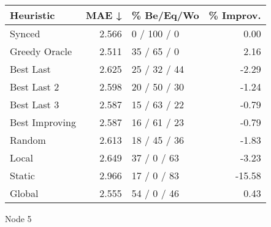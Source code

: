 \begin{tabular}{lrlr}
\toprule
\textbf{Heuristic} & \textbf{MAE ↓} & \textbf{\% Be/Eq/Wo} & \textbf{\% Improv.} \\
\midrule
            Synced &          2.566 &          0 / 100 / 0 &                0.00 \\
     Greedy Oracle &          2.511 &          35 / 65 / 0 &                2.16 \\
         Best Last &          2.625 &         25 / 32 / 44 &               -2.29 \\
       Best Last 2 &          2.598 &         20 / 50 / 30 &               -1.24 \\
       Best Last 3 &          2.587 &         15 / 63 / 22 &               -0.79 \\
    Best Improving &          2.587 &         16 / 61 / 23 &               -0.79 \\
            Random &          2.613 &         18 / 45 / 36 &               -1.83 \\
             Local &          2.649 &          37 / 0 / 63 &               -3.23 \\
            Static &          2.966 &          17 / 0 / 83 &              -15.58 \\
            Global &          2.555 &          54 / 0 / 46 &                0.43 \\
\bottomrule
\end{tabular}
\caption{Node 5}
\label{tab:hr_iid_lr05_le1_bs4_5}
